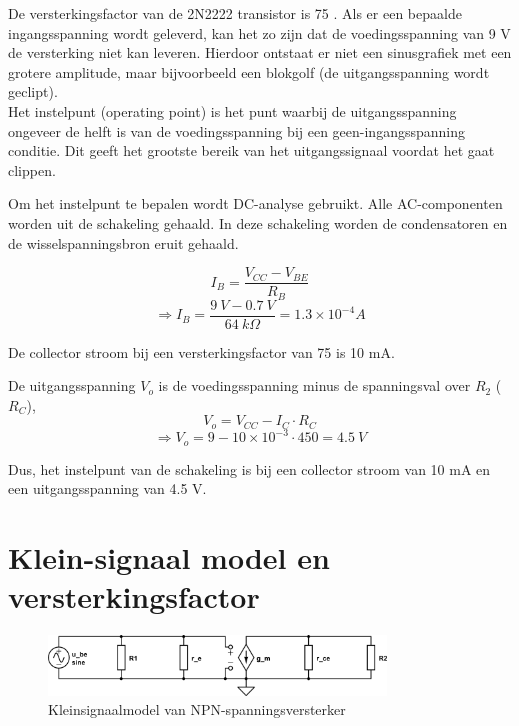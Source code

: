 \documentclass{report}
\begin{document}
De versterkingsfactor van de 2N2222 transistor is 75 \cite[p.~3]{epo2-non-linear}. Als er een bepaalde ingangsspanning wordt geleverd, kan het zo zijn dat de voedingsspanning van 9 V de versterking niet kan leveren. Hierdoor ontstaat er niet een sinusgrafiek met een grotere amplitude, maar bijvoorbeeld een blokgolf (de uitgangsspanning wordt geclipt).\\

Het instelpunt (operating point) is het punt waarbij de uitgangsspanning ongeveer de helft is van de voedingsspanning bij een geen-ingangsspanning conditie. Dit geeft het grootste bereik van het uitgangssignaal voordat het gaat clippen. 

Om het instelpunt te bepalen wordt DC-analyse gebruikt. Alle AC-componenten worden uit de schakeling gehaald. In deze schakeling worden de condensatoren en de wisselspanningsbron eruit gehaald.

\begin{equation}
I_B=\frac{V_{CC}-V_{BE}}{R_B}
\end{equation}
$$\Rightarrow I_B=\frac{9\: V-0.7 \: V}{64 \: k \Omega}=1.3\times 10^{-4}A$$

\noindent De collector stroom bij een versterkingsfactor van 75 is 10 mA. 

\noindent De uitgangsspanning $V_o$ is de voedingsspanning minus de spanningsval over $R_2$ ($R_C$),
\begin{equation}
V_o=V_{CC}-I_{C} \cdot R_{C}
\end{equation}
$$\Rightarrow V_o=9-10\times 10^{-3}\cdot 450=4.5 \: V$$

\noindent Dus, het instelpunt van de schakeling is bij een collector stroom van 10 mA en een uitgangsspanning van 4.5 V.

\chapter{Klein-signaal model en versterkingsfactor}

\begin{figure}[H]
	\centering
	\label{fig:npn-amplifier-kleinsignaal}
	\includegraphics[width=0.8\textwidth]{resource/npn-kleinsignaal-versterker}
	\caption{Kleinsignaalmodel van NPN-spanningsversterker}
\end{figure}
\end{document}
